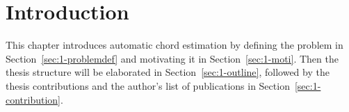 

\chapter{Introduction}\label{cp:intro}





This chapter introduces automatic chord estimation by defining the problem in Section~\ref{sec:1-problemdef} and motivating it in Section~\ref{sec:1-moti}. Then the thesis structure will be elaborated in Section~\ref{sec:1-outline}, followed by the thesis contributions and the author's list of publications in Section~\ref{sec:1-contribution}.

